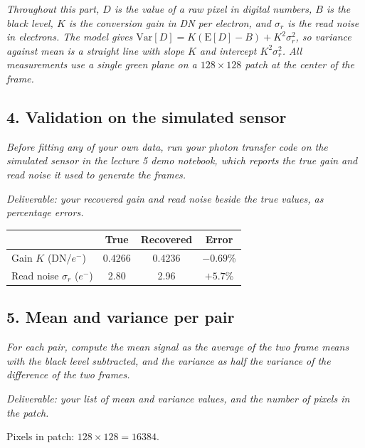 \documentclass[11pt]{article}
\newcommand{\task}[3]{\subsection*{#1}{\sloppy\noindent\textit{#2}\par}\smallskip\noindent\textit{Deliverable: #3}\par\medskip}
\begin{document}
\noindent\textit{Throughout this part, $D$ is the value of a raw pixel in digital numbers, $B$ is the black level, $K$ is the conversion gain in DN per electron, and $\sigma_r$ is the read noise in electrons. The model gives $\mathrm{Var}[D] = K(\mathrm{E}[D] - B) + K^2\sigma_r^2$, so variance against mean is a straight line with slope $K$ and intercept $K^2\sigma_r^2$. All measurements use a single green plane on a $128 \times 128$ patch at the center of the frame.}\par\medskip

\task{4. Validation on the simulated sensor}
{Before fitting any of your own data, run your photon transfer code on the simulated sensor in the lecture 5 demo notebook, which reports the true gain and read noise it used to generate the frames.}
{your recovered gain and read noise beside the true values, as percentage errors.}

\begin{center}
\begin{tabular}{lccc}
\toprule
 & True & Recovered & Error \\
\midrule
Gain $K$ (DN/$e^-$) & 0.4266 & 0.4236 & $-0.69$\% \\
Read noise $\sigma_r$ ($e^-$) & 2.80 & 2.96 & $+5.7$\% \\
\bottomrule
\end{tabular}
\end{center}

\task{5. Mean and variance per pair}
{For each pair, compute the mean signal as the average of the two frame means with the black level subtracted, and the variance as half the variance of the difference of the two frames.}
{your list of mean and variance values, and the number of pixels in the patch.}

\noindent Pixels in patch: $128 \times 128 = 16384$.
\end{document}
